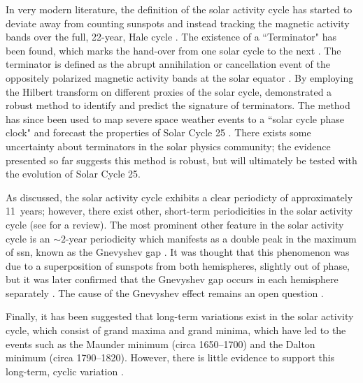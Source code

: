 In very modern literature, the definition of the solar activity cycle has started to deviate away from counting sunspots and instead tracking the magnetic activity bands over the full, 22-year, Hale cycle \citep{leamon_termination_2018, leamon_timing_2020}. The existence of a ``Terminator" has been found, which marks the hand-over from one solar cycle to the next \citep{mcintosh_deciphering_2014, mcintosh_what_2019}. The terminator is defined as the abrupt annihilation or cancellation event of the oppositely polarized magnetic activity bands at the solar equator \citep{mcintosh_what_2019}. By employing the Hilbert transform on different proxies of the solar cycle, \citet{leamon_timing_2020} demonstrated a robust method to identify and predict the signature of terminators. The method has since been used to map severe space weather events to a ``solar cycle phase clock" \citep{chapman_quantifying_2020} and forecast the properties of Solar Cycle 25 \citep{mcintosh_overlapping_2020}. There exists some uncertainty about terminators in the solar physics community; the evidence presented so far suggests this method is robust, but will ultimately be tested with the evolution of Solar Cycle 25.


As discussed, the solar activity cycle exhibits a clear periodicty of approximately 11~years; however, there exist other, short-term periodicities in the solar activity cycle (see \citet{hathaway_solar_2015} for a review). The most prominent other feature in the solar activity cycle is an $\sim2$-year periodicity which manifests as a double peak in the maximum of \gls{ssn}, known as the Gnevyshev gap \citep{gnevyshev_corona_1963, gnevyshev_11-years_1967}. It was thought that this phenomenon was due to a superposition of sunspots from both hemispheres, slightly out of phase, but it was later confirmed that the Gnevyshev gap occurs in each hemisphere separately \citep{norton_solar-cycle_2009}. The cause of the Gnevyshev effect remains an open question \citep{hathaway_solar_2015}.

Finally, it has been suggested that long-term variations exist in the solar activity cycle, which consist of grand maxima and grand minima, which have led to the events such as the Maunder minimum (circa 1650--1700) and the Dalton minimum (circa 1790--1820). However, there is little evidence to support this long-term, cyclic variation \citep{hathaway_solar_2015}.




